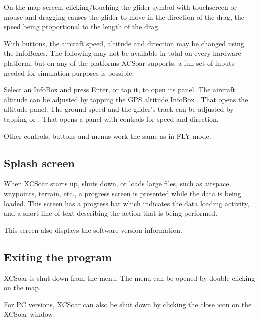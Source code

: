 On the map screen, clicking/touching the glider symbol
with touchscreen or mouse and dragging 
causes the glider to move in the direction of the drag, the
speed being proportional to the length of the drag.

With buttons, the aircraft
speed, altitude and direction may be changed using the InfoBoxes.
The following may not be available in total on every hardware platform, but on 
any of the platforms XCSoar supports, a full set of inputs needed for 
simulation purposes is possible.

Select an InfoBox and press Enter, or tap it, to open its panel.
The aircraft altitude can be adjusted by tapping the GPS altitude
InfoBox .  That opens the altitude panel.
The ground speed and the glider's track can be adjusted by tapping
 or .  That opens a panel with controls
for speed and direction.

Other controls, buttons and menus work the same as in FLY mode.


\subsection*{Splash screen}
When XCSoar starts up, shuts down, or loads large files, such as airspace,
waypoints, terrain, etc., a progress screen is presented while the data is being
loaded. This screen has a progress bar which indicates the data loading
activity, and a short line of text describing the action that is being performed.

This screen also displays the software version information.

\subsection*{Exiting the program}
XCSoar is shut down from the menu. The menu can be
opened by double-clicking on the map.
\begin{quote}
\end{quote}

For PC versions, XCSoar can also be shut down by clicking the close icon
on the XCSoar window.

